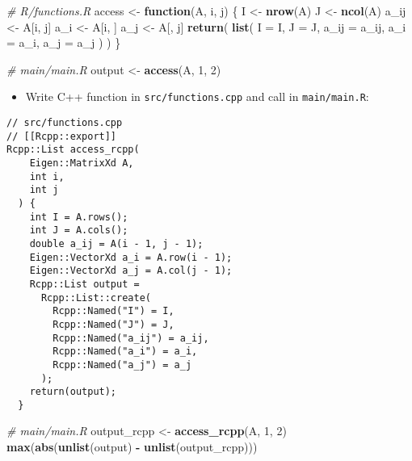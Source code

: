 \documentclass[
]{book}
\newenvironment{Shaded}{\begin{snugshade}}{\end{snugshade}}
\newcommand{\CommentTok}[1]{\textcolor[rgb]{0.56,0.35,0.01}{\textit{#1}}}
\newcommand{\ControlFlowTok}[1]{\textcolor[rgb]{0.13,0.29,0.53}{\textbf{#1}}}
\newcommand{\DataTypeTok}[1]{\textcolor[rgb]{0.13,0.29,0.53}{#1}}
\newcommand{\DecValTok}[1]{\textcolor[rgb]{0.00,0.00,0.81}{#1}}
\newcommand{\KeywordTok}[1]{\textcolor[rgb]{0.13,0.29,0.53}{\textbf{#1}}}
\newcommand{\NormalTok}[1]{#1}
\newcommand{\OperatorTok}[1]{\textcolor[rgb]{0.81,0.36,0.00}{\textbf{#1}}}
\newcommand{\StringTok}[1]{\textcolor[rgb]{0.31,0.60,0.02}{#1}}
\providecommand{\tightlist}{%
  \setlength{\itemsep}{0pt}\setlength{\parskip}{0pt}}
\begin{document}
\begin{Shaded}
\begin{Highlighting}[]
\CommentTok{# R/functions.R}
\NormalTok{access <-}\StringTok{ }
\StringTok{  }\ControlFlowTok{function}\NormalTok{(A, i, j) \{}
\NormalTok{    I <-}\StringTok{ }\KeywordTok{nrow}\NormalTok{(A)}
\NormalTok{    J <-}\StringTok{ }\KeywordTok{ncol}\NormalTok{(A)}
\NormalTok{    a_ij <-}\StringTok{ }\NormalTok{A[i, j]}
\NormalTok{    a_i <-}\StringTok{ }\NormalTok{A[i, ]}
\NormalTok{    a_j <-}\StringTok{ }\NormalTok{A[, j]}
    \KeywordTok{return}\NormalTok{(}
      \KeywordTok{list}\NormalTok{(}
        \DataTypeTok{I =}\NormalTok{ I,}
        \DataTypeTok{J =}\NormalTok{ J,}
        \DataTypeTok{a_ij =}\NormalTok{ a_ij,}
        \DataTypeTok{a_i =}\NormalTok{ a_i,}
        \DataTypeTok{a_j =}\NormalTok{ a_j}
\NormalTok{      )}
\NormalTok{    )}
\NormalTok{  \}}
\end{Highlighting}
\end{Shaded}

\begin{Shaded}
\begin{Highlighting}[]
\CommentTok{# main/main.R}
\NormalTok{output <-}\StringTok{ }\KeywordTok{access}\NormalTok{(A, }\DecValTok{1}\NormalTok{, }\DecValTok{2}\NormalTok{)}
\end{Highlighting}
\end{Shaded}

\begin{itemize}
\tightlist
\item
  Write C++ function in \texttt{src/functions.cpp} and call in \texttt{main/main.R}:
\end{itemize}

\begin{verbatim}
// src/functions.cpp
// [[Rcpp::export]]
Rcpp::List access_rcpp(
    Eigen::MatrixXd A, 
    int i, 
    int j
  ) {
    int I = A.rows();
    int J = A.cols();
    double a_ij = A(i - 1, j - 1);
    Eigen::VectorXd a_i = A.row(i - 1);
    Eigen::VectorXd a_j = A.col(j - 1);
    Rcpp::List output =
      Rcpp::List::create(
        Rcpp::Named("I") = I,
        Rcpp::Named("J") = J,
        Rcpp::Named("a_ij") = a_ij,
        Rcpp::Named("a_i") = a_i,
        Rcpp::Named("a_j") = a_j
      );
    return(output);
  }
\end{verbatim}

\begin{Shaded}
\begin{Highlighting}[]
\CommentTok{# main/main.R}
\NormalTok{output_rcpp <-}\StringTok{ }\KeywordTok{access_rcpp}\NormalTok{(A, }\DecValTok{1}\NormalTok{, }\DecValTok{2}\NormalTok{)}
\KeywordTok{max}\NormalTok{(}\KeywordTok{abs}\NormalTok{(}\KeywordTok{unlist}\NormalTok{(output) }\OperatorTok{-}\StringTok{ }\KeywordTok{unlist}\NormalTok{(output_rcpp)))}
\end{Highlighting}
\end{Shaded}
\end{document}
